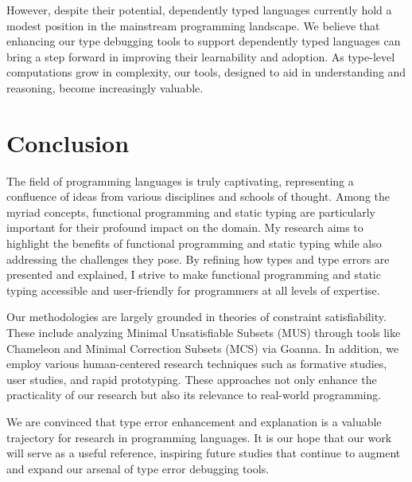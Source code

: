 However, despite their potential, dependently typed languages currently hold a modest position in the mainstream programming landscape. We believe that enhancing our type debugging tools to support dependently typed languages can bring a step forward in improving their learnability and adoption. As type-level computations grow in complexity, our tools, designed to aid in understanding and reasoning, become increasingly valuable. 


\section{Conclusion}


The field of programming languages is truly captivating, representing a confluence of ideas from various disciplines and schools of thought. Among the myriad concepts, functional programming and static typing are particularly important for their profound impact on the domain. My research aims to highlight the benefits of functional programming and static typing while also addressing the challenges they pose. By refining how types and type errors are presented and explained, I strive to make functional programming and static typing accessible and user-friendly for programmers at all levels of expertise.

Our methodologies are largely grounded in theories of constraint satisfiability. These include analyzing Minimal Unsatisfiable Subsets (MUS) through tools like Chameleon and Minimal Correction Subsets (MCS) via Goanna. In addition, we employ various human-centered research techniques such as formative studies, user studies, and rapid prototyping. These approaches not only enhance the practicality of our research but also its relevance to real-world programming.

We are convinced that type error enhancement and explanation is a valuable trajectory for research in programming languages. It is our hope that our work will serve as a useful reference, inspiring future studies that continue to augment and expand our arsenal of type error debugging tools.


